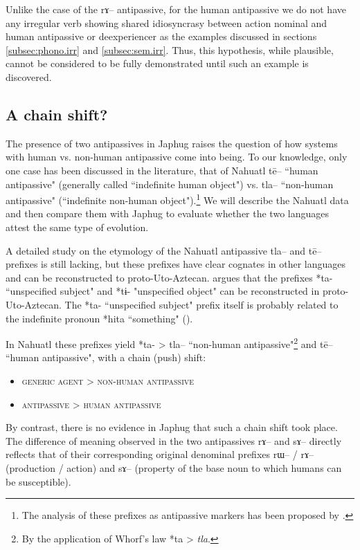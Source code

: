 \documentclass[oldfontcommands,oneside,a4paper,11pt]{article}
\newcommand{\ipa}[1]{{\phon \mbox{#1}}} %
\begin{document}
Unlike the case of the \ipa{rɤ}-- antipassive, for the human antipassive we do not have any irregular verb showing shared idiosyncrasy between action nominal and human antipassive or deexperiencer as the examples discussed in sections \ref{subsec:phono.irr} and  \ref{subsec:sem.irr}. Thus, this hypothesis, while plausible, cannot be considered to be fully demonstrated until such an example is discovered.
 
\subsection{A chain shift?} \label{subsec:chain}
The presence of two antipassives in Japhug raises the question of how systems with human vs. non-human antipassive come into being. To our knowledge, only one case has been discussed in the literature, that of Nahuatl \ipa{tē}-- ``human antipassive" (generally called ``indefinite human object") vs. \ipa{tla}-- ``non-human antipassive" (``indefinite non-human object").\footnote{The analysis of these prefixes as antipassive markers has been proposed by \citet[91]{creissels06sgit2}.} We will describe  the Nahuatl data and then compare  them with Japhug to evaluate whether the two languages attest the same type of evolution.


A detailed study on the etymology of the Nahuatl antipassive \ipa{tla}-- and \ipa{tē}-- prefixes is still lacking, but these prefixes have clear cognates in other languages and can be reconstructed to proto-Uto-Aztecan. \citet[46]{langacker77ua} argues that  the prefixes *ta- ``unspecified subject"  and *tɨ- "unspecified object"   can be reconstructed in proto-Uto-Aztecan. The *ta- ``unspecified subject" prefix itself is probably related to the indefinite pronoun *hita ``something" (\citealt[120]{langacker77ua}).


In Nahuatl these prefixes yield *ta- > \ipa{tla}-- ``non-human antipassive"\footnote{By the application of Whorf's law *ta > \textit{tla}.} and \ipa{tē}-- ``human antipassive", with a chain (push) shift: 

\begin{itemize}
\item \textsc{generic agent} > \textsc{non-human antipassive}
\item \textsc{antipassive} > \textsc{human antipassive}
\end{itemize}

By contrast, there is no evidence in Japhug that such a chain shift took place. The difference of meaning observed in the two antipassives \ipa{rɤ}-- and \ipa{sɤ}-- directly reflects that of their corresponding original denominal prefixes \ipa{rɯ}-- / \ipa{rɤ}-- (production / action) and   \ipa{sɤ}-- (property of the base noun to which humans can be susceptible). 
\end{document}
